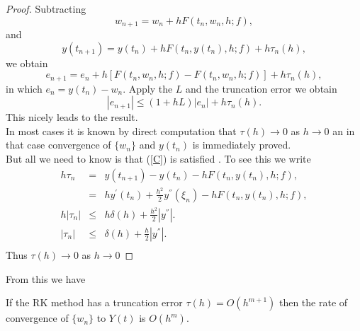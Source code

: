 \begin{proof}
Subtracting
\[ w_{n+1}=w_n +hF(t_n,w_n,h;f),\]
and
\[y( t_{n+1})=y(t_n) +hF(t_n,y(t_n),h;f)+h\tau_n(h),\]
we obtain
\[ e_{n+1}=e_n +h[F(t_n,w_n,h;f)-F(t_n,w_n,h;f)]+h\tau_n(h),\]
in which $e_n=y(t_n)-w_n$. Apply the  $L$ and the truncation
error we obtain
\[|e_{n+1}| \leq (1+hL)|e_n| + h \tau_n(h). \]
This nicely leads to the result.\\
In most cases it is known by direct computation that $\tau(h) \rightarrow 0$ as $h \rightarrow 0$
an in that case convergence of $\{w_n \}$ and $y(t_n)$ is immediately proved.
\\
But all we need to know is that (\ref{C}) is satisfied .  To see this we write
\[\begin{array}{ccc}
h\tau_n &=& y( t_{n+1})-y(t_n) -hF(t_n,y(t_n),h;f),\\
&=&hy^{'}(t_n)+\frac{h^{2}}{2}y^{''}(\xi_n) -hF(t_n,y(t_n),h;f),\\
h|\tau_n| &\leq& h\delta(h)+\frac{h^{2}}{2}|y^{''}|.\\
|\tau_n| &\leq& \delta(h)+\frac{h}{2}|y^{''}|.\\
\end{array}
\]
Thus $\tau(h) \rightarrow 0$ as $h \rightarrow 0$
\end{proof}
From this we have
\begin{corollary}
If the RK method has a truncation error $\tau(h)=O(h^{m+1})$ then the rate of
convergence of $\{w_n\}$ to $Y(t)$ is $O(h^m)$.
\end{corollary}

